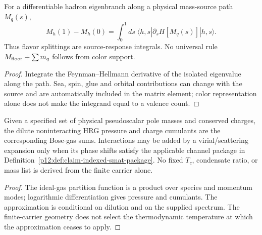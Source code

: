 \documentclass[12pt,a4paper]{article}
\begin{document}
\begin{corollary}
\label{p11:cor:primitive-flavor-floors-native}

For a differentiable hadron eigenbranch along a physical mass-source path \(M_q(s)\),
\[
M_h(1)-M_h(0)=\int_0^1\!ds\;\langle h,s|\partial_sH[M_q(s)]|h,s\rangle.
\]
Thus flavor splittings are source-response integrals.  No universal rule \(M_{\rm floor}+\sum m_q\) follows from color support.
\label{p11:eq:primitive-meson-flavor-floor}
\label{p11:eq:primitive-decuplet-equal-spacing-native}
\end{corollary}
\begin{proof}

Integrate the Feynman--Hellmann derivative of the isolated eigenvalue along the path.  Sea, spin, glue and orbital contributions can change with the source and are automatically included in the matrix element; color representation alone does not make the integrand equal to a valence count.
\end{proof}

\begin{corollary}
\label{p11:cor:pseudoscalar-hrg-native}

Given a specified set of physical pseudoscalar pole masses and conserved
charges, the dilute noninteracting HRG pressure and charge cumulants are the
corresponding Bose-gas sums.  Interactions may be added by a virial/scattering
expansion only when its phase shifts satisfy the applicable channel package in
Definition~\ref{p12:def:claim-indexed-smat-package}.  No fixed \(T_c\),
condensate ratio, or mass list is derived from the finite carrier alone.
\label{p11:eq:pseudoscalar-hrg-pressure-native}
\label{p11:eq:native-ps-hrg-tc-numerics}
\label{p11:eq:native-condensate-ps-hrg}
\label{p11:eq:native-lowT-charge-susceptibilities}
\end{corollary}
\begin{proof}

The ideal-gas partition function is a product over species and momentum modes; logarithmic differentiation gives pressure and cumulants.  The approximation is conditional on dilution and on the supplied spectrum.  The finite-carrier geometry does not select the thermodynamic temperature at which the approximation ceases to apply.
\end{proof}
\end{document}
